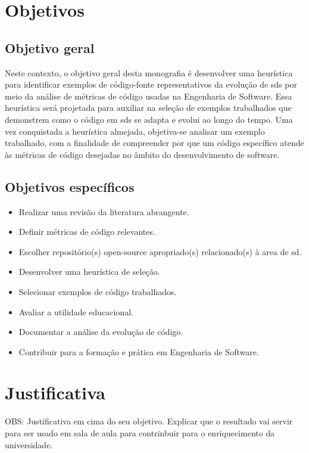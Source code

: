 \section{Objetivos}\label{sec:objetivos}
\subsection{Objetivo geral}\label{subsec:objetivoGeral}
 Neste contexto, o objetivo geral desta monografia é desenvolver uma heurística para identificar exemplos de código-fonte representativos da evolução de \gls{sds} por meio da análise de métricas de código usadas na Engenharia de Software. Essa heurística será projetada para auxiliar na seleção de exemplos trabalhados que demonstrem como o código em \gls{sds} se adapta e evolui ao longo do tempo. Uma vez conquistada a heurística almejada, objetiva-se analisar um exemplo trabalhado, com a finalidade de compreender por que um código específico atende às métricas de código desejadas no âmbito do desenvolvimento de software.

\subsection{Objetivos específicos}\label{subsec:objetivosEspecificos}
\begin{itemize}
    \item Realizar uma revisão da literatura abrangente.
    \item Definir métricas de código relevantes.
    \item Escolher repositório(s) open-source apropriado(s) relacionado(s) à area de \gls{sd}.
    \item Desenvolver uma heurística de seleção.
    \item Selecionar exemplos de código trabalhados.
    \item Avaliar a utilidade educacional.
    \item Documentar a análise da evolução de código.
    \item Contribuir para a formação e prática em Engenharia de Software.
\end{itemize}

\section{Justificativa}\label{sec:justificativa}
OBS: Justificativa em cima do seu objetivo.
Explicar que o resultado vai servir para ser usado em sala de aula para contrinbuir para o enriquecimento da universidade.

